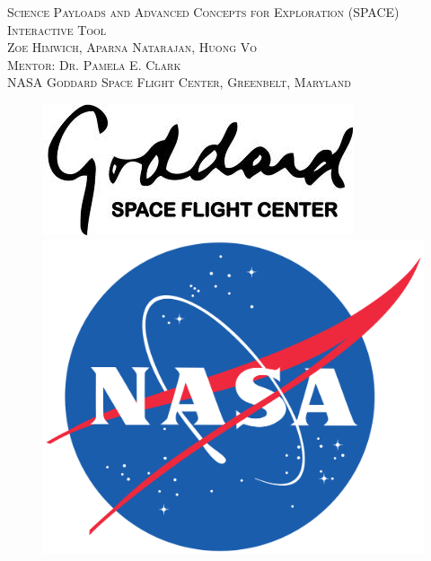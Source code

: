 \documentclass[a4, 12 pt]{article} %
\begin{document}
\begin{titlepage}
\newcommand{\HRule}{\rule{\linewidth}{0.5mm}} 
\centering

\textsc{\Large Science Payloads and Advanced Concepts for Exploration (SPACE) Interactive Tool \\[7mm] \normalsize Zoe Himwich, Aparna Natarajan, Huong Vo\\[4mm] Mentor: Dr. Pamela E. Clark}\\[0.8cm] 
\textsc{NASA Goddard Space Flight Center, Greenbelt, Maryland}\\[124mm] 

\begin{figure}[h]
\centering
\begin{minipage}{.5\textwidth}
  \centering
  \includegraphics[width=1\linewidth, left]{goddard.jpg} %
\end{minipage}%
\begin{minipage}{.5\textwidth}
  \includegraphics[width=0.55\linewidth, right]{nasa.png} %
\end{minipage}
\end{figure}
\end{titlepage}

\tableofcontents
\newpage
\end{document}
